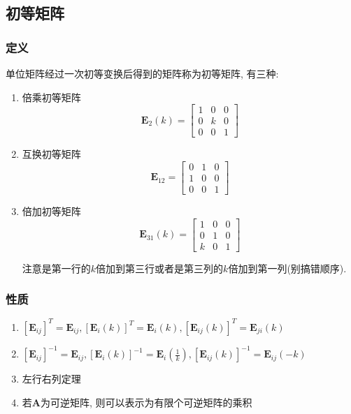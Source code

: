 \subsection{初等矩阵}
\subsubsection{定义}
单位矩阵经过一次初等变换后得到的矩阵称为初等矩阵, 有三种:
\begin{enumerate}
	\item 倍乘初等矩阵
	\begin{equation*}
		\bm{E}_{2}(k)=
		\begin{bmatrix}
			1 & 0 & 0 \\
			0 & k & 0 \\
			0 & 0 & 1
		\end{bmatrix}
	\end{equation*}
	\item 互换初等矩阵
	\begin{equation*}
		\bm{E}_{12}=
		\begin{bmatrix}
			0 & 1 & 0 \\
			1 & 0 & 0 \\
			0 & 0 & 1
		\end{bmatrix}
	\end{equation*}
	\item 倍加初等矩阵
	\begin{equation*}
		\bm{E}_{31}(k)=
		\begin{bmatrix}
			1 & 0 & 0 \\
			0 & 1 & 0 \\
			k & 0 & 1
		\end{bmatrix}
	\end{equation*}\par 注意是第一行的$ k $倍加到第三行或者是第三列的$ k $倍加到第一列(别搞错顺序).
\end{enumerate}
\subsubsection{性质}
\begin{enumerate}
	\item $ [\bm{E}_{ij}]^{T}=\bm{E}_{ij}, [\bm{E}_{i}(k)]^{T}=\bm{E}_{i}(k), [\bm{E}_{ij}(k)]^{T}=\bm{E}_{ji}(k) $
	\item $ [\bm{E}_{ij}]^{-1}=\bm{E}_{ij}, [\bm{E}_{i}(k)]^{-1}=\bm{E}_{i}(\frac{1}{k}), [\bm{E}_{ij}(k)]^{-1}=\bm{E}_{ij}(-k) $
	\item 左行右列定理
	\item 若$ \bm{A} $为可逆矩阵, 则可以表示为有限个可逆矩阵的乘积
\end{enumerate}
